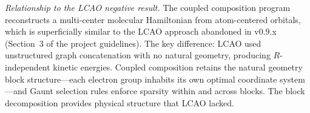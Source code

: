 \documentclass[aps,pra,twocolumn,superscriptaddress,longbibliography]{revtex4-2}
\begin{document}
\emph{Relationship to the LCAO negative result.}  The coupled
composition program reconstructs a multi-center molecular Hamiltonian
from atom-centered orbitals, which is superficially similar to the
LCAO approach abandoned in v0.9.x (Section~3 of the project
guidelines).  The key difference: LCAO used unstructured graph
concatenation with no natural geometry, producing $R$-independent
kinetic energies.  Coupled composition retains the natural geometry
block structure---each electron group inhabits its own optimal
coordinate system---and Gaunt selection rules enforce sparsity within
and across blocks.  The block decomposition provides physical
structure that LCAO lacked.


\end{document}
